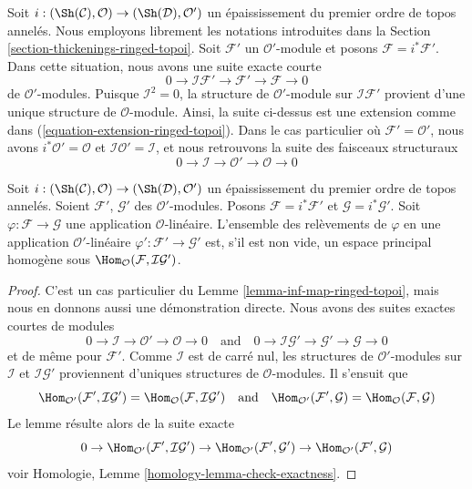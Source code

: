 \noindent
Soit $i : (\Sh(\mathcal{C}), \mathcal{O}) \to (\Sh(\mathcal{D}), \mathcal{O}')$
un épaississement du premier ordre de topos annelés. Nous employons librement
les notations introduites dans la
Section \ref{section-thickenings-ringed-topoi}.
Soit $\mathcal{F}'$ un $\mathcal{O}'$-module et posons
$\mathcal{F} = i^*\mathcal{F}'$.
Dans cette situation, nous avons une suite exacte courte
$$
0 \to \mathcal{I}\mathcal{F}' \to \mathcal{F}' \to \mathcal{F} \to 0
$$
de $\mathcal{O}'$-modules. Puisque $\mathcal{I}^2 = 0$, la structure de
$\mathcal{O}'$-module sur $\mathcal{I}\mathcal{F}'$ provient d'une unique
structure de $\mathcal{O}$-module.
Ainsi, la suite ci-dessus est une extension comme dans
(\ref{equation-extension-ringed-topoi}).
Dans le cas particulier où $\mathcal{F}' = \mathcal{O}'$, nous avons
$i^*\mathcal{O}' = \mathcal{O}$ et
$\mathcal{I}\mathcal{O}' = \mathcal{I}$, et nous retrouvons la suite des
faisceaux structuraux
$$
0 \to \mathcal{I} \to \mathcal{O}' \to \mathcal{O} \to 0
$$

\begin{lemma}
\label{lemma-inf-map-special-ringed-topoi}
Soit $i : (\Sh(\mathcal{C}), \mathcal{O}) \to (\Sh(\mathcal{D}), \mathcal{O}')$
un épaississement du premier ordre de topos annelés.
Soient $\mathcal{F}'$, $\mathcal{G}'$ des $\mathcal{O}'$-modules.
Posons $\mathcal{F} = i^*\mathcal{F}'$ et
$\mathcal{G} = i^*\mathcal{G}'$.
Soit $\varphi : \mathcal{F} \to \mathcal{G}$ une application
$\mathcal{O}$-linéaire.
L'ensemble des relèvements de $\varphi$ en une application
$\mathcal{O}'$-linéaire $\varphi' : \mathcal{F}' \to \mathcal{G}'$ est, s'il
est non vide, un espace principal homogène sous
$\Hom_\mathcal{O}(\mathcal{F}, \mathcal{I}\mathcal{G}')$.
\end{lemma}

\begin{proof}
C'est un cas particulier du Lemme \ref{lemma-inf-map-ringed-topoi}, mais nous
en donnons aussi une démonstration directe. Nous avons des suites exactes
courtes de modules
$$
0 \to \mathcal{I} \to \mathcal{O}' \to \mathcal{O} \to 0
\quad\text{and}\quad
0 \to \mathcal{I}\mathcal{G}' \to \mathcal{G}' \to \mathcal{G} \to 0
$$
et de même pour $\mathcal{F}'$.
Comme $\mathcal{I}$ est de carré nul, les structures de $\mathcal{O}'$-modules
sur $\mathcal{I}$ et $\mathcal{I}\mathcal{G}'$ proviennent d'uniques structures
de $\mathcal{O}$-modules. Il s'ensuit que
$$
\Hom_{\mathcal{O}'}(\mathcal{F}', \mathcal{I}\mathcal{G}') =
\Hom_\mathcal{O}(\mathcal{F}, \mathcal{I}\mathcal{G}')
\quad\text{and}\quad
\Hom_{\mathcal{O}'}(\mathcal{F}', \mathcal{G}) =
\Hom_\mathcal{O}(\mathcal{F}, \mathcal{G})
$$
Le lemme résulte alors de la suite exacte
$$
0 \to \Hom_{\mathcal{O}'}(\mathcal{F}', \mathcal{I}\mathcal{G}') \to
\Hom_{\mathcal{O}'}(\mathcal{F}', \mathcal{G}') \to
\Hom_{\mathcal{O}'}(\mathcal{F}', \mathcal{G})
$$
voir Homologie, Lemme \ref{homology-lemma-check-exactness}.
\end{proof}

